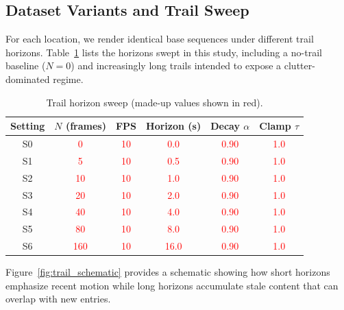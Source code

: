 \documentclass[twocolumn, 10pt]{article}
\newcommand{\ph}[1]{\textcolor{red}{#1}}
\begin{document}
\subsection{Dataset Variants and Trail Sweep}
For each location, we render identical base sequences under different trail horizons. Table~\ref{tab:trail_sweep} lists the horizons swept in this study, including a no-trail baseline ($N=0$) and increasingly long trails intended to expose a clutter-dominated regime.

\begin{table}[t]
\centering
\caption{Trail horizon sweep (made-up values shown in red).}
\label{tab:trail_sweep}
\begin{tabular}{@{}cccccc@{}}
\toprule
\textbf{Setting} & $N$ (frames) & FPS & Horizon (s) & Decay $\alpha$ & Clamp $\tau$ \\
\midrule
S0 & \ph{0} & \ph{10} & \ph{0.0} & \ph{0.90} & \ph{1.0} \\
S1 & \ph{5} & \ph{10} & \ph{0.5} & \ph{0.90} & \ph{1.0} \\
S2 & \ph{10} & \ph{10} & \ph{1.0} & \ph{0.90} & \ph{1.0} \\
S3 & \ph{20} & \ph{10} & \ph{2.0} & \ph{0.90} & \ph{1.0} \\
S4 & \ph{40} & \ph{10} & \ph{4.0} & \ph{0.90} & \ph{1.0} \\
S5 & \ph{80} & \ph{10} & \ph{8.0} & \ph{0.90} & \ph{1.0} \\
S6 & \ph{160} & \ph{10} & \ph{16.0} & \ph{0.90} & \ph{1.0} \\
\bottomrule
\end{tabular}
\end{table}

Figure~\ref{fig:trail_schematic} provides a schematic showing how short horizons emphasize recent motion while long horizons accumulate stale content that can overlap with new entries.
\end{document}
